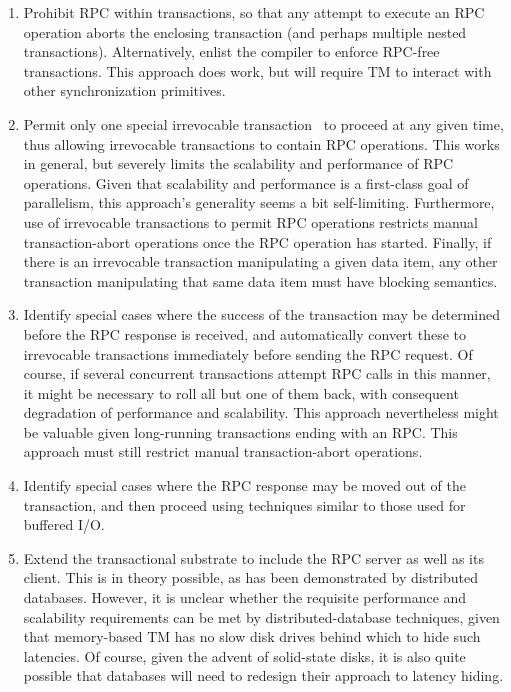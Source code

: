 \begin{enumerate}
\item	Prohibit RPC within transactions, so that any attempt to execute
	an RPC operation aborts the enclosing transaction (and perhaps
	multiple nested transactions).
	Alternatively, enlist the compiler to enforce RPC-free
	transactions.
	This approach does work, but will require TM to
	interact with other synchronization primitives.
\item	Permit only one special
	irrevocable transaction~\cite{SpearMichaelScott2008InevitableSTM}
	to proceed at any given time, thus allowing irrevocable
	transactions to contain RPC operations.
	This works in general, but severely limits the scalability and
	performance of RPC operations.
	Given that scalability and performance is a first-class goal of
	parallelism, this approach's generality seems a bit self-limiting.
	Furthermore, use of irrevocable transactions to permit RPC
	operations restricts manual transaction-abort operations
	once the RPC operation has started.
	Finally, if there is an irrevocable transaction manipulating
	a given data item, any other transaction manipulating that
	same data item must have blocking semantics.
\item	Identify special cases where the success of the transaction may
	be determined before the RPC response is received, and
	automatically convert these to irrevocable transactions immediately
	before sending the RPC request.
	Of course, if several concurrent transactions attempt RPC calls
	in this manner, it might be necessary to roll all but one of them
	back, with consequent degradation of performance and scalability.
	This approach nevertheless might be valuable given long-running
	transactions ending with an RPC\@.
	This approach must still restrict manual transaction-abort
	operations.
\item	Identify special cases where the RPC response may be moved out
	of the transaction, and then proceed using techniques similar
	to those used for buffered I/O.
\item	Extend the transactional substrate to include the RPC server as
	well as its client.
	This is in theory possible, as has been demonstrated by
	distributed databases.
	However, it is unclear whether the requisite performance and
	scalability requirements can be met by distributed-database
	techniques, given that memory-based TM has no slow disk drives
	behind which to hide such latencies.
	Of course, given the advent of solid-state disks, it is also quite
	possible that databases will need to redesign their approach to
	latency hiding.
\end{enumerate}

